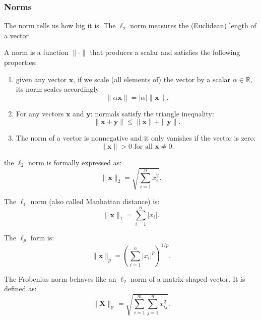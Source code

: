 \documentclass[]{article}
\begin{document}
\subsubsection{Norms}
The norm tells us how big it is.
The $\ell_2$ norm measures the (Euclidean) length of a vector

A norm is a function $\| \cdot \|$ that produces a scalar and satisfies the following
properties:
\begin{enumerate}
    \item given any vector $\mathbf{x}$, if we scale (all elements of) the vector by
          a scalar $\alpha \in \mathbb{R}$, its norm scales accordingly
          \begin{equation}
              \|\alpha \mathbf{x}\| = |\alpha| \|\mathbf{x}\|.   \tag{2.3.10}
          \end{equation}
    \item For any vectors $\mathbf{x}$ and $\mathbf{y}$: normals satisfy the triangle
          inequality:
          \begin{equation}
              \|\mathbf{x} + \mathbf{y}\| \leq \|\mathbf{x}\| + \|\mathbf{y}\|. \tag{2.3.11}
          \end{equation}
    \item The norm of a vector is nonnegative and it only vanishes if the vector
          is zero:
          \begin{equation}
              \|\mathbf{x}\| > 0 \textrm{ for all } \mathbf{x} \neq 0. \tag{2.3.12}
          \end{equation}
\end{enumerate}

the $\ell_2$ norm is formally expressed as:
\begin{equation}
    \|\mathbf{x}\|_2 = \sqrt{\sum_{i=1}^n x_i^2}. \tag{2.3.13}
\end{equation}

The $\ell_1$ norm (also called Manhattan distance) is:
\begin{equation}
    \|\mathbf{x}\|_1 = \sum_{i=1}^n \left|x_i \right|. \tag{2.3.14}
\end{equation}

The $\ell_p$ form is:
\begin{equation}
    \|\mathbf{x}\|_p = \left(\sum_{i=1}^n \left|x_i \right|^p \right)^{1/p}. \tag{2.3.15}
\end{equation}

The Frobenius norm behaves like an $\ell_2$ norm of a matrix-shaped vector. It is
defined as:
\begin{equation}
    \|\mathbf{X}\|_\textrm{F} = \sqrt{\sum_{i=1}^m \sum_{j=1}^n x_{ij}^2}. \tag{2.3.16}
\end{equation}
\end{document}
